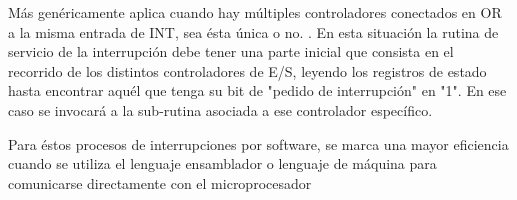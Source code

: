 \documentclass[12pt, letter]{article}
\begin{document}
\setlength{\parindent}{31pt}
Más genéricamente aplica cuando hay múltiples controladores conectados en OR a la misma entrada de INT, sea ésta única o no. \parencite{ArquitecturaCom}. En esta situación la rutina de servicio de la interrupción debe tener una parte inicial que consista en el recorrido de los distintos controladores de E/S, leyendo los registros de estado hasta encontrar aquél que tenga su bit de "pedido de interrupción" en "1". En ese caso se invocará a la sub-rutina asociada a ese controlador específico.

\setlength{\parindent}{31pt}
Para éstos procesos de interrupciones por software, se marca una mayor eficiencia cuando se utiliza el lenguaje ensamblador o lenguaje de máquina para comunicarse directamente con el microprocesador

\printbibliography[title={Referencias}\nocite{*}]
\end{document}

